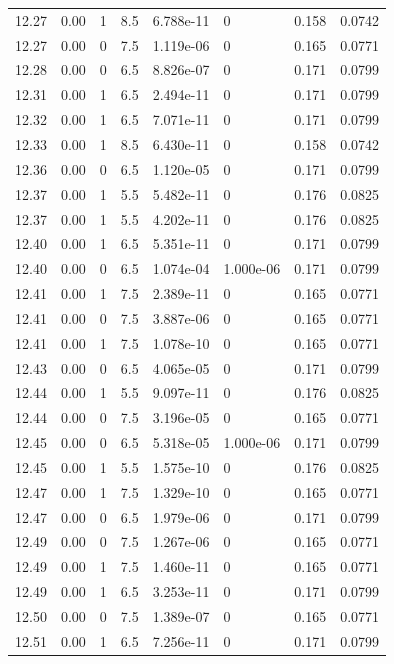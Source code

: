 \documentclass[preview]{standalone}
\begin{document}
{{{{{{{{{{{{{{\begin{tabular}{L{1.2cm}C{1.2cm} C{0.3cm}C{0.5cm} C{1.4cm}C{1.4cm} C{1.4cm}C{1.4cm}}
  12.27  &  0.00  & 1     & 8.5 &  6.788e-11  & 0  & 0.158 &  0.0742   \\ 
  12.27  &  0.00  & 0     & 7.5 &  1.119e-06  & 0  & 0.165 &  0.0771   \\ 
  12.28  &  0.00  & 0     & 6.5 &  8.826e-07  & 0  & 0.171 &  0.0799   \\ 
  12.31  &  0.00  & 1     & 6.5 &  2.494e-11  & 0  & 0.171 &  0.0799   \\ 
  12.32  &  0.00  & 1     & 6.5 &  7.071e-11  & 0  & 0.171 &  0.0799   \\ 
  12.33  &  0.00  & 1     & 8.5 &  6.430e-11  & 0  & 0.158 &  0.0742   \\ 
  12.36  &  0.00  & 0     & 6.5 &  1.120e-05  & 0  & 0.171 &  0.0799   \\ 
  12.37  &  0.00  & 1     & 5.5 &  5.482e-11  & 0  & 0.176 &  0.0825   \\ 
  12.37  &  0.00  & 1     & 5.5 &  4.202e-11  & 0  & 0.176 &  0.0825   \\ 
  12.40  &  0.00  & 1     & 6.5 &  5.351e-11  & 0  & 0.171 &  0.0799   \\ 
  12.40  &  0.00  & 0     & 6.5 &  1.074e-04  & 1.000e-06  & 0.171 &  0.0799   \\ 
  12.41  &  0.00  & 1     & 7.5 &  2.389e-11  & 0  & 0.165 &  0.0771   \\ 
  12.41  &  0.00  & 0     & 7.5 &  3.887e-06  & 0  & 0.165 &  0.0771   \\ 
  12.41  &  0.00  & 1     & 7.5 &  1.078e-10  & 0  & 0.165 &  0.0771   \\ 
  12.43  &  0.00  & 0     & 6.5 &  4.065e-05  & 0  & 0.171 &  0.0799   \\ 
  12.44  &  0.00  & 1     & 5.5 &  9.097e-11  & 0  & 0.176 &  0.0825   \\ 
  12.44  &  0.00  & 0     & 7.5 &  3.196e-05  & 0  & 0.165 &  0.0771   \\ 
  12.45  &  0.00  & 0     & 6.5 &  5.318e-05  & 1.000e-06  & 0.171 &  0.0799   \\ 
  12.45  &  0.00  & 1     & 5.5 &  1.575e-10  & 0  & 0.176 &  0.0825   \\ 
  12.47  &  0.00  & 1     & 7.5 &  1.329e-10  & 0  & 0.165 &  0.0771   \\ 
  12.47  &  0.00  & 0     & 6.5 &  1.979e-06  & 0  & 0.171 &  0.0799   \\ 
  12.49  &  0.00  & 0     & 7.5 &  1.267e-06  & 0  & 0.165 &  0.0771   \\ 
  12.49  &  0.00  & 1     & 7.5 &  1.460e-11  & 0  & 0.165 &  0.0771   \\ 
  12.49  &  0.00  & 1     & 6.5 &  3.253e-11  & 0  & 0.171 &  0.0799   \\ 
  12.50  &  0.00  & 0     & 7.5 &  1.389e-07  & 0  & 0.165 &  0.0771   \\ 
  12.51  &  0.00  & 1     & 6.5 &  7.256e-11  & 0  & 0.171 &  0.0799   \\ 
\hline 
\end{tabular} 

}}}}}}}}}}}}}}
\end{document}
